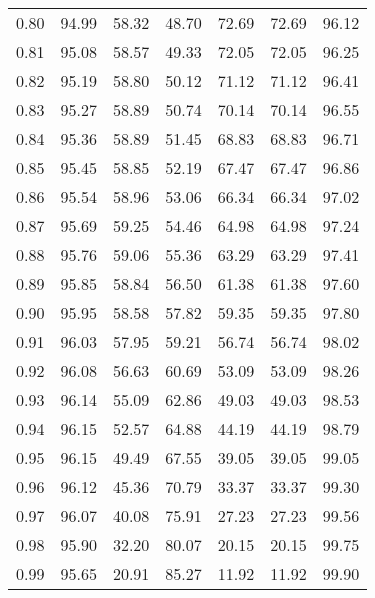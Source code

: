 \begin{tabular}{|c|c|c|c|c|c|c|}
      0.80 &     94.99 &     58.32 &      48.70 &   72.69 &      72.69 &         96.12 \\
      0.81 &     95.08 &     58.57 &      49.33 &   72.05 &      72.05 &         96.25 \\
      0.82 &     95.19 &     58.80 &      50.12 &   71.12 &      71.12 &         96.41 \\
      0.83 &     95.27 &     58.89 &      50.74 &   70.14 &      70.14 &         96.55 \\
      0.84 &     95.36 &     58.89 &      51.45 &   68.83 &      68.83 &         96.71 \\
      0.85 &     95.45 &     58.85 &      52.19 &   67.47 &      67.47 &         96.86 \\
      0.86 &     95.54 &     58.96 &      53.06 &   66.34 &      66.34 &         97.02 \\
      0.87 &     95.69 &     59.25 &      54.46 &   64.98 &      64.98 &         97.24 \\
      0.88 &     95.76 &     59.06 &      55.36 &   63.29 &      63.29 &         97.41 \\
      0.89 &     95.85 &     58.84 &      56.50 &   61.38 &      61.38 &         97.60 \\
      0.90 &     95.95 &     58.58 &      57.82 &   59.35 &      59.35 &         97.80 \\
      0.91 &     96.03 &     57.95 &      59.21 &   56.74 &      56.74 &         98.02 \\
      0.92 &     96.08 &     56.63 &      60.69 &   53.09 &      53.09 &         98.26 \\
      0.93 &     96.14 &     55.09 &      62.86 &   49.03 &      49.03 &         98.53 \\
      0.94 &     96.15 &     52.57 &      64.88 &   44.19 &      44.19 &         98.79 \\
      0.95 &     96.15 &     49.49 &      67.55 &   39.05 &      39.05 &         99.05 \\
      0.96 &     96.12 &     45.36 &      70.79 &   33.37 &      33.37 &         99.30 \\
      0.97 &     96.07 &     40.08 &      75.91 &   27.23 &      27.23 &         99.56 \\
      0.98 &     95.90 &     32.20 &      80.07 &   20.15 &      20.15 &         99.75 \\
      0.99 &     95.65 &     20.91 &      85.27 &   11.92 &      11.92 &         99.90 \\
\bottomrule
\end{tabular}
